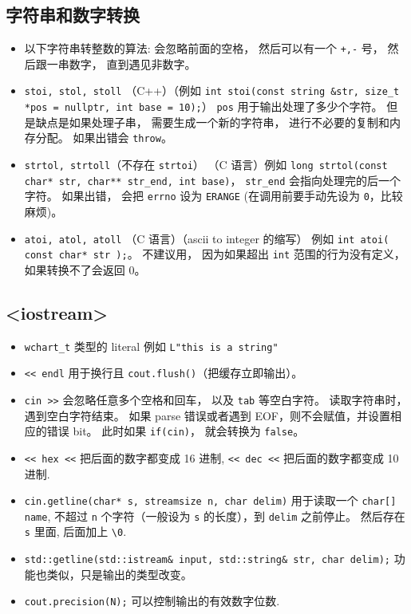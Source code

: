 \subsection{字符串和数字转换}
\begin{itemize}
\item 以下字符串转整数的算法: 会忽略前面的空格， 然后可以有一个 \verb`+,-` 号， 然后跟一串数字， 直到遇见非数字。
\item \verb`stoi, stol, stoll` （C++）（例如 \verb`int stoi(const string &str, size_t *pos = nullptr, int base = 10);`） \verb`pos` 用于输出处理了多少个字符。 但是缺点是如果处理子串， 需要生成一个新的字符串， 进行不必要的复制和内存分配。 如果出错会 \verb`throw`。
\item \verb`strtol, strtoll`（不存在 \verb`strtoi`） （C 语言）例如 \verb`long strtol(const char* str, char** str_end, int base)`， \verb`str_end` 会指向处理完的后一个字符。 如果出错， 会把 \verb`errno` 设为 \verb`ERANGE` (在调用前要手动先设为 \verb`0`，比较麻烦)。
\item \verb`atoi, atol, atoll` （C 语言）（ascii to integer 的缩写） 例如 \verb`int atoi( const char* str );`。 不建议用， 因为如果超出 \verb`int` 范围的行为没有定义， 如果转换不了会返回 0。
\end{itemize}

\subsection{<iostream>}
\begin{itemize}
\item \verb`wchart_t` 类型的 literal 例如 \verb`L"this is a string"`
\item \verb`<< endl` 用于换行且 \verb`cout.flush()`（把缓存立即输出）。
\item \verb`cin >>` 会忽略任意多个空格和回车， 以及 \verb`tab` 等空白字符。 读取字符串时，遇到空白字符结束。 如果 parse 错误或者遇到 EOF，则不会赋值，并设置相应的错误 bit。 此时如果 \verb`if(cin)`， 就会转换为 \verb`false`。
\item \verb`<< hex <<` 把后面的数字都变成 16 进制, \verb`<< dec <<` 把后面的数字都变成 10 进制.
\item \verb`cin.getline(char* s, streamsize n, char delim)` 用于读取一个 \verb`char[] name`, 不超过 \verb`n` 个字符（一般设为 \verb`s` 的长度），到 \verb`delim` 之前停止。 然后存在 \verb`s` 里面, 后面加上 \verb`\0`.
\item \verb`std::getline(std::istream& input, std::string& str, char delim);` 功能也类似，只是输出的类型改变。
\item \verb`cout.precision(N);` 可以控制输出的有效数字位数.
\end{itemize}

